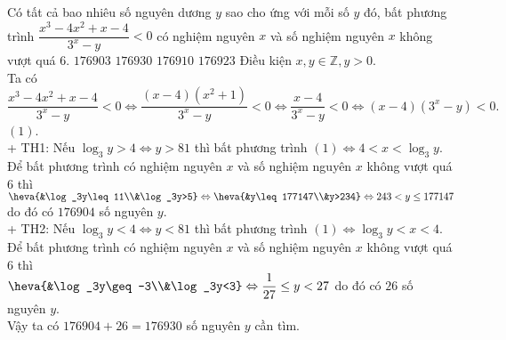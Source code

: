\begin{ex}%
Có tất cả bao nhiêu số nguyên dương $y$ sao cho ứng với mỗi số $y$ đó, bất phương trình $\dfrac{x^3-4x^2+x-4}{3^x-y} < 0$ có nghiệm nguyên $x$ và số nghiệm nguyên $x$ không vượt quá $6.$
\choice
{$176903$}
{\True $176930$}
{$176910$}
{$176923$}
\loigiai
{Điều kiện $ x, y \in \mathbb{Z}, y > 0$.\\
Ta có $\dfrac{x^3-4x^2+x-4}{3^x-y} < 0\Leftrightarrow \dfrac{(x-4)(x^2+1)}{3^x-y}<0\Leftrightarrow \dfrac{x-4}{3^x-y}<0\Leftrightarrow (x-4)(3^x-y)<0.$ \quad $(1)$.\\ 
+ TH1: Nếu $\log_3 y > 4 \Leftrightarrow y > 81$ thì bất phương trình $(1) \Leftrightarrow 4 < x < \log_3 y$.\\
Để bất phương trình có nghiệm nguyên $x$ và số nghiệm nguyên $x$ không vượt quá $6$ thì \\
$\heva{&\log_3y\leq 11\\&\log_3y>5}\Leftrightarrow \heva{&y\leq 177147\\&y>234}\Leftrightarrow 243<y\leq 177147$ do đó
có $176904$ số nguyên $y$.\\
+ TH2: Nếu $\log_3 y < 4 \Leftrightarrow y < 81$ thì bất phương trình $(1)\Leftrightarrow \log_3 y < x < 4$.\\
Để bất phương trình có nghiệm nguyên $x$ và số nghiệm nguyên $x$ không vượt quá $6$ thì \\
$\heva{&\log_3y\geq -3\\&\log_3y<3}\Leftrightarrow \dfrac{1}{27}\leq y < 27 $ do đó có $26$ số nguyên $y$.\\
Vậy ta có $176904 + 26 = 176930$ số nguyên $y$ cần tìm.
}
\end{ex}

